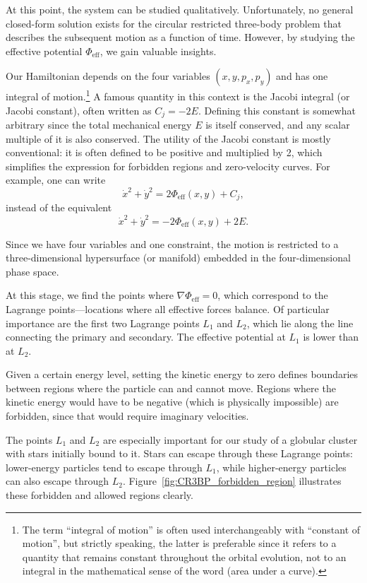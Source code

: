         At this point, the system can be studied qualitatively. Unfortunately, no general closed-form solution exists for the circular restricted three-body problem that describes the subsequent motion as a function of time. However, by studying the effective potential \(\Phi_\mathrm{eff}\), we gain valuable insights.

        Our Hamiltonian depends on the four variables \((x, y, p_x, p_y)\) and has one integral of motion.\footnote{The term ``integral of motion'' is often used interchangeably with ``constant of motion'', but strictly speaking, the latter is preferable since it refers to a quantity that remains constant throughout the orbital evolution, not to an integral in the mathematical sense of the word (area under a curve).} A famous quantity in this context is the Jacobi integral (or Jacobi constant), often written as \(C_j = -2E\). Defining this constant is somewhat arbitrary since the total mechanical energy \(E\) is itself conserved, and any scalar multiple of it is also conserved. The utility of the Jacobi constant is mostly conventional: it is often defined to be positive and multiplied by 2, which simplifies the expression for forbidden regions and zero-velocity curves. For example, one can write
        \[
        \dot{x}^2 + \dot{y}^2 = 2 \Phi_\mathrm{eff}(x,y) + C_j,
        \]
        instead of the equivalent
        \[
        \dot{x}^2 + \dot{y}^2 = -2 \Phi_\mathrm{eff}(x,y) + 2E.
        \]
        

        Since we have four variables and one constraint, the motion is restricted to a three-dimensional hypersurface (or manifold) embedded in the four-dimensional phase space.

        At this stage, we find the points where \(\nabla \Phi_\mathrm{eff} = 0\), which correspond to the Lagrange points—locations where all effective forces balance. Of particular importance are the first two Lagrange points \(L_1\) and \(L_2\), which lie along the line connecting the primary and secondary. The effective potential at \(L_1\) is lower than at \(L_2\).

        Given a certain energy level, setting the kinetic energy to zero defines boundaries between regions where the particle can and cannot move. Regions where the kinetic energy would have to be negative (which is physically impossible) are forbidden, since that would require imaginary velocities.

        The points \(L_1\) and \(L_2\) are especially important for our study of a globular cluster with stars initially bound to it. Stars can escape through these Lagrange points: lower-energy particles tend to escape through \(L_1\), while higher-energy particles can also escape through \(L_2\). Figure~\ref{fig:CR3BP_forbidden_region} illustrates these forbidden and allowed regions clearly.




